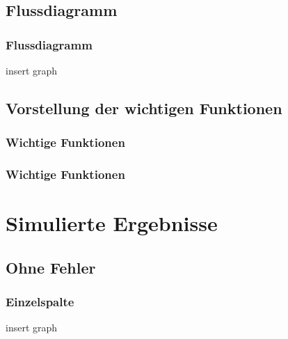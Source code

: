 \documentclass{beamer}
\begin{document}
\subsection{Flussdiagramm}
\begin{frame}
  \frametitle{Flussdiagramm}

insert graph\\







\end{frame}






\subsection{Vorstellung der wichtigen Funktionen}
\begin{frame}
  \frametitle{Wichtige Funktionen}







\end{frame}



\begin{frame}
  \frametitle{Wichtige Funktionen}







\end{frame}



\section{Simulierte Ergebnisse}
\subsection{Ohne Fehler}
\begin{frame}
  \frametitle{Einzelspalte}

insert graph\\

\end{frame}
\end{document}
